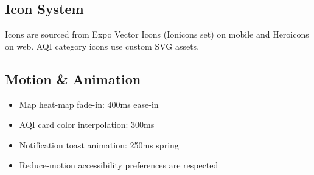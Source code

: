 \documentclass[11pt]{article}
\begin{document}
\subsection{Icon System}

Icons are sourced from Expo Vector Icons (Ionicons set) on mobile and Heroicons on web. AQI category icons use custom SVG assets.

\subsection{Motion \& Animation}

\begin{itemize}
    \item Map heat-map fade-in: 400ms ease-in
    \item AQI card color interpolation: 300ms
    \item Notification toast animation: 250ms spring
    \item Reduce-motion accessibility preferences are respected
\end{itemize}
\end{document}
